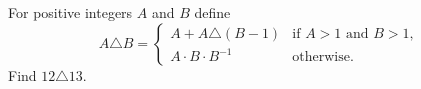 For positive integers $A$ and $B$ define
\[A\triangle B=\begin{cases}A+A\triangle(B-1)&\text{if }A>1\text{ and }B>1,\\A\cdot B\cdot B^{-1}&\text{otherwise.}\end{cases}\]
Find $12\triangle13$.
